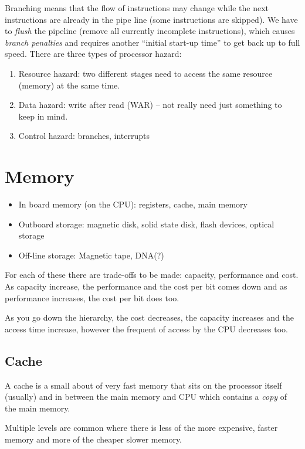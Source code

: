 Branching means that the flow of instructions may change while the next instructions are already in the pipe line (some instructions are skipped).
We have to \emph{flush} the pipeline (remove all currently incomplete instructions), which causes \emph{branch penalties} and requires another ``initial start-up time'' to get back up to full speed.
There are three types of processor hazard:
\begin{enumerate}
    \item Resource hazard: two different stages need to access the same resource (memory) at the same time.
    \item Data hazard: write after read (WAR) -- not really need just something to keep in mind.
    \item Control hazard: branches, interrupts
\end{enumerate}
\section{Memory}\label{sec:memory}

\begin{itemize}
    \item In board memory (on the CPU): registers, cache, main memory
    \item Outboard storage: magnetic disk, solid state disk, flash devices, optical storage
    \item Off-line storage: Magnetic tape, DNA(?)
\end{itemize}
%
For each of these there are trade-offs to be made: capacity, performance and cost.
As capacity increase, the performance and the cost per bit comes down and as performance increases, the cost per bit does too.

As you go down the hierarchy, the cost decreases, the capacity increases and the access time increase, however the frequent of access by the CPU decreases too.

\subsection{Cache}\label{sub:cache}

A cache is a small about of very fast memory that sits on the processor itself (usually) and in between the main memory and CPU which contains a \emph{copy} of the main memory.

Multiple levels are common where there is less of the more expensive, faster memory and more of the cheaper slower memory.

